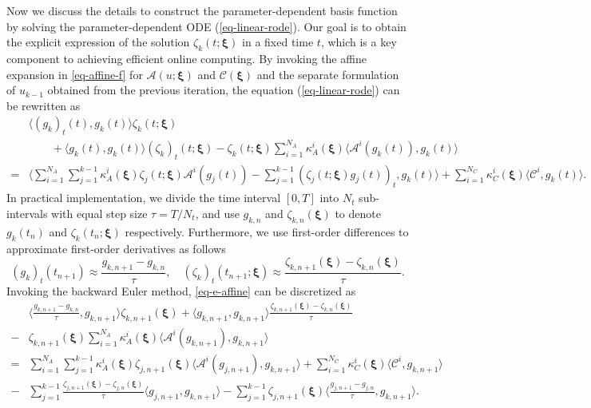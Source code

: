 \documentclass[10pt,a4paper]{article}
\numberwithin{equation}{section}
\numberwithin{lemma}{section}
\numberwithin{example}{section}
\numberwithin{definition}{section}
\numberwithin{assumption}{section}
\numberwithin{theorem}{section}
\numberwithin{proposition}{section}
\numberwithin{corollary}{section}
\numberwithin{remark}{section}
\begin{document}
Now we discuss the details to construct the parameter-dependent basis function by solving the parameter-dependent ODE (\ref{eq-linear-rode}).  Our goal is to obtain the explicit expression of the solution $\zeta_k(t;\bm{\xi})$ in a fixed time $t$, which is a key component to achieving efficient online computing.
By invoking the affine expansion in \eqref{eq-affine-f} for $\mathcal{A}(u;\bm{\xi})$ and $\mathcal{C}(\bm{\xi})$ and the separate formulation of $u_{k-1}$ obtained from the previous iteration, the equation (\ref{eq-linear-rode}) can be rewritten as 
\begin{equation}
\label{eq-e-affine}
\begin{aligned}
&\langle (g_k)_t(t),g_k(t)\rangle \zeta_k(t;\bm{\xi})
\\
&\qquad+ 
\langle g_k(t),g_k(t)\rangle (\zeta_k)_t(t;\bm{\xi})-\zeta_k(t;\bm{\xi})\sum_{i=1}^{N_A}\kappa_A^i(\bm{\xi}) \langle \mathcal{A}^i(g_k(t)),g_k(t)\rangle\\
=&\Big\langle\sum_{i=1}^{N_A}\sum_{j=1}^{k-1}\kappa_A^i(\bm{\xi})\zeta_{j}(t;\bm{\xi}) \mathcal{A}^i(g_{j}(t))- \sum_{j=1}^{k-1}(\zeta_{j}(t;\bm{\xi})g_j(t))_t,g_k(t)\Big\rangle
+\sum_{i=1}^{N_C}\kappa_C^i(\bm{\xi})\langle \mathcal{C}^i,g_k(t)\rangle.
\end{aligned}
\end{equation}
In practical implementation, we divide the time interval $[0,T]$ into $N_t$ sub-intervals with equal step size $\tau=T/N_t$, and use $g_{k,n}$ and $\zeta_{k,n}(\bm{\xi})$ to denote $g_k(t_n)$ and $\zeta_k(t_n;\bm{\xi})$ respectively. 
Furthermore, we use first-order differences to approximate first-order derivatives as follows
$$
(g_k)_t(t_{n+1})\approx\frac{g_{k,n+1}-g_{k,n}}{\tau},
\quad 
(\zeta_k)_t(t_{n+1};\bm{\xi})\approx\frac{\zeta_{k,n+1}(\bm{\xi})-\zeta_{k,n}(\bm{\xi})}{\tau}.
$$
Invoking the backward Euler method, \eqref{eq-e-affine} can be discretized as 
$$
    \begin{aligned}
        &\Big\langle \frac{g_{k,n+1}-g_{k,n}}{\tau},g_{k,n+1}\Big\rangle \zeta_{k,n+1}(\bm{\xi})+
        \langle g_{k,n+1},g_{k,n+1}\rangle \frac{\zeta_{k,n+1}(\bm{\xi})-\zeta_{k,n}(\bm{\xi})}{\tau}\\
        -&\zeta_{k,n+1}(\bm{\xi})\sum_{i=1}^{N_A}\kappa_A^i(\bm{\xi}) \langle \mathcal{A}^i(g_{k,n+1}),g_{k,n+1}\rangle\\
        =&\sum_{i=1}^{N_A} \sum_{j=1}^{k-1}\kappa_A^i(\bm{\xi})\zeta_{j,n+1}(\bm{\xi})\langle \mathcal{A}^i(g_{j,n+1}),g_{k,n+1}\rangle
        +\sum_{i=1}^{N_C}\kappa_C^i(\bm{\xi})\langle \mathcal{C}^i,g_{k,n+1}\rangle
        \\
        -&\sum_{j=1}^{k-1}\frac{\zeta_{j,n+1}(\bm{\xi})-\zeta_{j,n}(\bm{\xi})}{\tau}\langle g_{j,n+1},g_{k,n+1}\rangle
        -\sum_{j=1}^{k-1}\zeta_{j,n+1}(\bm{\xi})\Big\langle 
        \frac{g_{j,n+1}-g_{j,n}}{\tau},g_{k,n+1}\Big\rangle.
    \end{aligned}
$$
\end{document}
